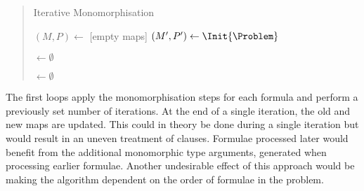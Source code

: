 \documentclass[]{ceurart}
\begin{document}
\begin{quote}
\begin{algorithm}




   \caption{Iterative Monomorphisation}

   \((M, P) \leftarrow\) [empty maps]\;
   \((M', P') \leftarrow \Init{\Problem}\)\;

   \AllSubst\(\leftarrow \emptyset\)\;



   \NewFormulae \(\leftarrow\emptyset\)\;
   \Return \NewFormulae\;

\end{algorithm}
\end{quote}

The first loops apply the monomorphisation steps for each formula and perform a previously set number of iterations. At the end of a single iteration, the old and new maps are updated. This could in theory be done during a single iteration but would result in an uneven treatment of clauses. Formulae processed later would benefit from the additional monomorphic type arguments, generated when processing earlier formulae. Another undesirable effect of this approach would be making the algorithm dependent on the order of formulae in the problem.
\end{document}
